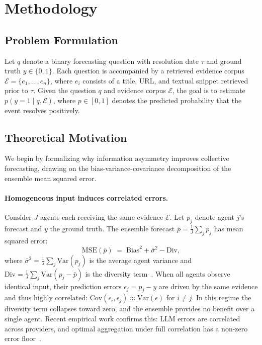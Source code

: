 \section{Methodology}
\label{sec:method}

\subsection{Problem Formulation}

Let $q$ denote a binary forecasting question with resolution date $\tau$ and ground truth $y \in \{0,1\}$.
Each question is accompanied by a retrieved evidence corpus
$\mathcal{E} = \{e_1, \dots, e_n\}$, where $e_i$ consists of a title, URL, and textual snippet retrieved prior to $\tau$.
Given the question $q$ and evidence corpus $\mathcal{E}$, the goal is to estimate
$p(y = 1 \mid q, \mathcal{E})$,
where $p \in [0,1]$ denotes the predicted probability that the event resolves positively.

\subsection{Theoretical Motivation}
\label{sec:theory}

We begin by formalizing why information asymmetry improves collective forecasting, drawing on the bias-variance-covariance decomposition of the ensemble mean squared error.

\paragraph{Homogeneous input induces correlated errors.}
Consider $J$ agents each receiving the same evidence $\mathcal{E}$.
Let $p_j$ denote agent $j$'s forecast and $y$ the ground truth.
The ensemble forecast $\bar{p} = \frac{1}{J}\sum_j p_j$ has mean squared error:
\begin{equation}
  \mathrm{MSE}(\bar{p}) \;=\; \mathrm{Bias}^2 + \bar{\sigma}^2 - \mathrm{Div},
  \label{eq:bvd}
\end{equation}
where $\bar{\sigma}^2 = \frac{1}{J}\sum_j \mathrm{Var}(p_j)$ is the average agent variance and $\mathrm{Div} = \frac{1}{J}\sum_j \mathrm{Var}(p_j - \bar{p})$ is the diversity term~\citep{wood2023unified}.
When all agents observe identical input, their prediction errors $\epsilon_j = p_j - y$ are driven by the same evidence and thus highly correlated: $\mathrm{Cov}(\epsilon_i, \epsilon_j) \approx \mathrm{Var}(\epsilon)$ for $i \neq j$.
In this regime the diversity term collapses toward zero, and the ensemble provides no benefit over a single agent.
Recent empirical work confirms this: LLM errors are correlated across providers, and optimal aggregation under full correlation has a non-zero error floor~\citep{kim2025correlated,turkmen2026don}.

